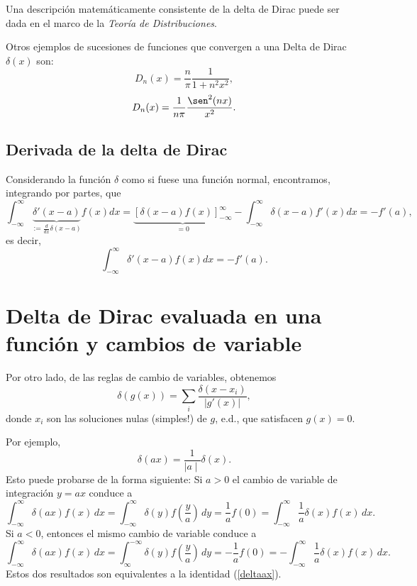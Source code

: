  Una descripción matemáticamente consistente de la delta de Dirac puede ser
dada en el marco de la \textit{Teoría de Distribuciones}.

Otros ejemplos de sucesiones de funciones que convergen a una Delta de Dirac $\delta(x)$ son:
\begin{equation}
D_n(x)=\frac{n}{\pi}\frac{1}{1+n^2x^2},
\end{equation}
\begin{equation}
D_n(x)=\frac{1}{n\pi}\frac{\sen^2(nx)}{x^2}.
\end{equation}


\subsection{Derivada de la delta de Dirac}

Considerando la función $\delta$ como si fuese una función normal,
encontramos, integrando por partes, que
\begin{equation}
  \int_{-\infty}^{\infty}\underbrace{\delta'(x-a)}_{:=\frac{d}{dx}
   \delta(x-a)} f(x)d x =\underbrace{[\delta(x-a)
   f(x)]_{-\infty}^{\infty}}_{=0}
  -\int_{-\infty}^{\infty}\delta(x-a)f'(x)d x = -f'(a),
 \end{equation}
es decir,
\begin{equation}
  \int_{-\infty}^{\infty}\delta'(x-a) f(x) d x = -f'(a).
 \end{equation}

\section{Delta de Dirac evaluada en una función y cambios de variable}
Por otro lado, de las reglas de cambio de variables, obtenemos
\begin{equation}
\boxed{  \delta(g(x)) = \sum_i\frac{\delta(x-x_i)}{\left|g'(x)\right|},}
 \end{equation}
 donde $x_i$ son las soluciones nulas (simples!) de $g$, e.d., que satisfacen
$g(x)=0$.

Por ejemplo,
\begin{equation}
\boxed{\delta(a x) = \frac{1}{\mid a \mid} \delta(x).}\label{deltaax}
\end{equation}
Esto puede probarse de la forma siguiente: Si $a > 0$ el cambio de variable de
integración $y = a x$ conduce a
\begin{equation}
\int_{- \infty}^{\infty} \delta(a x) f(x)\,d x =
\int_{- \infty}^{\infty} \delta(y) f(\frac{y}{a})\,dy = \frac{1}{a} f(0) =
\int_{- \infty}^{\infty} \frac{1}{a} \delta(x) f(x) \,dx.
\end{equation}
Si $a < 0$, entonces el mismo cambio de variable conduce a
\begin{equation}
\int_{- \infty}^{\infty} \delta(a x) f(x)\,dx =
\int_{\infty}^{- \infty} \delta(y) f(\frac{y}{a})\,dy = - \frac{1}{a} f(0) =
- \int_{- \infty}^{\infty} \frac{1}{a} \delta(x) f(x)\,dx.
\end{equation}
Estos dos resultados son equivalentes a la identidad (\ref{deltaax}).

